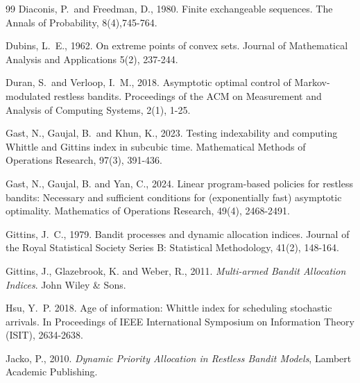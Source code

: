 \documentclass[12pt]{article}
\numberwithin{equation}{section}
\newcommand{\1}{\textbf{1}}
\begin{document}
\begin{thebibliography}{99}
 Diaconis, P.\ and Freedman, D., 1980. Finite exchangeable sequences. The Annals of Probability, 8(4),745-764.

 Dubins, L.\ E., 1962. On extreme points of convex sets. Journal of Mathematical Analysis and Applications 5(2), 237-244.

 Duran, S.\ and Verloop, I.\ M., 2018. Asymptotic optimal control of Markov-modulated restless bandits. Proceedings of the ACM on Measurement and Analysis of Computing Systems, 2(1), 1-25.

 Gast, N., Gaujal, B.\ and Khun, K., 2023. Testing indexability and computing Whittle and Gittins index in subcubic time. Mathematical Methods of Operations Research, 97(3), 391-436.

 Gast, N., Gaujal, B. and Yan, C., 2024. 
Linear program-based policies for restless bandits: Necessary and sufficient conditions for (exponentially fast) asymptotic optimality. Mathematics of Operations Research, 49(4), 2468-2491.

 Gittins, J.\ C., 1979. Bandit processes and dynamic allocation indices. Journal of the Royal Statistical Society Series B: Statistical Methodology, 41(2), 148-164.
    
 Gittins, J., Glazebrook, K. and Weber, R., 2011. 
{\it Multi-armed Bandit Allocation Indices}. John Wiley \& Sons.


    
 Hsu, Y.\ P. 2018. Age of information: {W}hittle index for scheduling stochastic arrivals. 
In Proceedings of IEEE International Symposium on Information Theory (ISIT), 2634-2638.     

 Jacko, P., 2010. {\it Dynamic Priority Allocation in Restless Bandit Models},
Lambert Academic Publishing.



\end{thebibliography}
\end{document}
